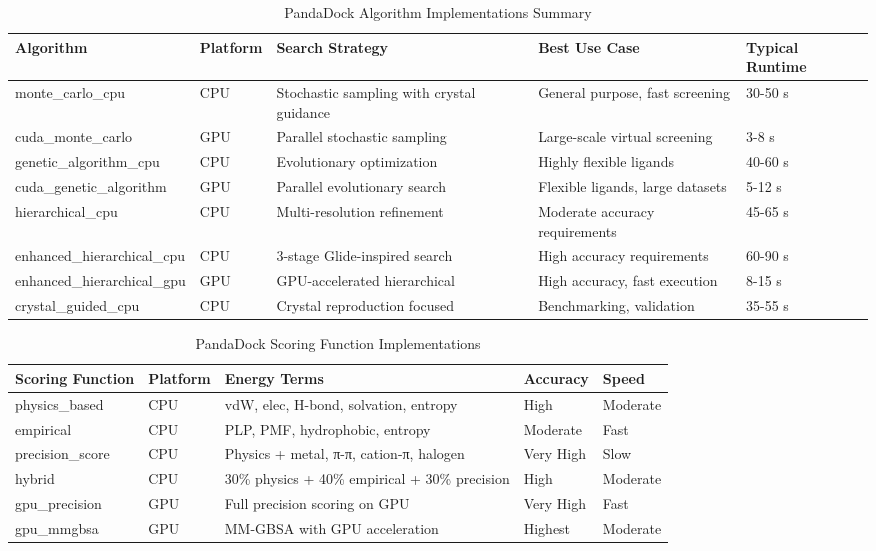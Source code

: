 \documentclass[11pt,a4paper]{article}
\begin{document}
\begin{table}[H]
\centering
\caption{PandaDock Algorithm Implementations Summary}
\begin{tabular}{p{4cm}p{2cm}p{3cm}p{3cm}p{3cm}}
\toprule
\textbf{Algorithm} & \textbf{Platform} & \textbf{Search Strategy} & \textbf{Best Use Case} & \textbf{Typical Runtime} \\
\midrule
monte\_carlo\_cpu & CPU & Stochastic sampling with crystal guidance & General purpose, fast screening & 30-50 s \\
cuda\_monte\_carlo & GPU & Parallel stochastic sampling & Large-scale virtual screening & 3-8 s \\
genetic\_algorithm\_cpu & CPU & Evolutionary optimization & Highly flexible ligands & 40-60 s \\
cuda\_genetic\_algorithm & GPU & Parallel evolutionary search & Flexible ligands, large datasets & 5-12 s \\
hierarchical\_cpu & CPU & Multi-resolution refinement & Moderate accuracy requirements & 45-65 s \\
enhanced\_hierarchical\_cpu & CPU & 3-stage Glide-inspired search & High accuracy requirements & 60-90 s \\
enhanced\_hierarchical\_gpu & GPU & GPU-accelerated hierarchical & High accuracy, fast execution & 8-15 s \\
crystal\_guided\_cpu & CPU & Crystal reproduction focused & Benchmarking, validation & 35-55 s \\
\bottomrule
\end{tabular}
\label{tab:algorithms_summary}
\end{table}

\begin{table}[H]
\centering
\caption{PandaDock Scoring Function Implementations}
\begin{tabular}{p{3cm}p{2cm}p{4cm}p{3cm}p{3cm}}
\toprule
\textbf{Scoring Function} & \textbf{Platform} & \textbf{Energy Terms} & \textbf{Accuracy} & \textbf{Speed} \\
\midrule
physics\_based & CPU & vdW, elec, H-bond, solvation, entropy & High & Moderate \\
empirical & CPU & PLP, PMF, hydrophobic, entropy & Moderate & Fast \\
precision\_score & CPU & Physics + metal, π-π, cation-π, halogen & Very High & Slow \\
hybrid & CPU & 30\% physics + 40\% empirical + 30\% precision & High & Moderate \\
gpu\_precision & GPU & Full precision scoring on GPU & Very High & Fast \\
gpu\_mmgbsa & GPU & MM-GBSA with GPU acceleration & Highest & Moderate \\
\bottomrule
\end{tabular}
\label{tab:scoring_summary}
\end{table}
\end{document}
